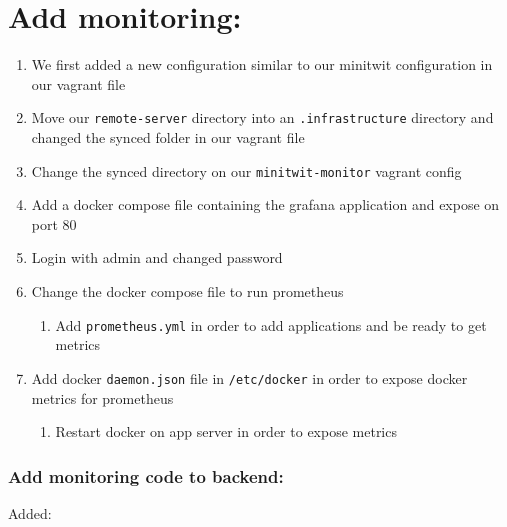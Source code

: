\section{Add monitoring:}
\label{log:add-monitoring}

\begin{enumerate}
    \item We first added a new configuration similar to our minitwit configuration in our vagrant file
    \item Move our \texttt{remote-server} directory into an \texttt{.infrastructure} directory and changed the synced folder in our vagrant file
    \item Change the synced directory on our \texttt{minitwit-monitor} vagrant config
    \item Add a docker compose file containing the grafana application and expose on port 80
    \item Login with admin and changed password
    \item Change the docker compose file to run prometheus
    \begin{enumerate}
        \item Add \texttt{prometheus.yml} in order to add applications and be ready to get metrics
    \end{enumerate}

    \item Add docker \texttt{daemon.json} file in \texttt{/etc/docker} in order to expose docker metrics for prometheus

    \begin{enumerate}
        \item Restart docker on app server in order to expose metrics
    \end{enumerate}
\end{enumerate}

\subsubsection{Add monitoring code to backend:}
\label{log:add-monitoring-code-to-backend}

Added:


